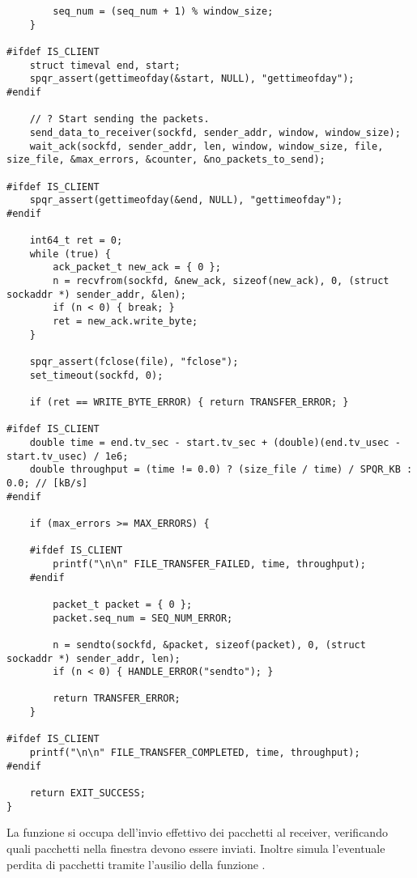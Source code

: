 \begin{lstlisting}
        seq_num = (seq_num + 1) % window_size;
    }

#ifdef IS_CLIENT
    struct timeval end, start;
    spqr_assert(gettimeofday(&start, NULL), "gettimeofday");
#endif

    // ? Start sending the packets.
    send_data_to_receiver(sockfd, sender_addr, window, window_size);
    wait_ack(sockfd, sender_addr, len, window, window_size, file, size_file, &max_errors, &counter, &no_packets_to_send);
    
#ifdef IS_CLIENT
    spqr_assert(gettimeofday(&end, NULL), "gettimeofday");
#endif

    int64_t ret = 0;
    while (true) {
        ack_packet_t new_ack = { 0 };
        n = recvfrom(sockfd, &new_ack, sizeof(new_ack), 0, (struct sockaddr *) sender_addr, &len);
        if (n < 0) { break; }
        ret = new_ack.write_byte;
    }

    spqr_assert(fclose(file), "fclose");
    set_timeout(sockfd, 0);

    if (ret == WRITE_BYTE_ERROR) { return TRANSFER_ERROR; }

#ifdef IS_CLIENT
    double time = end.tv_sec - start.tv_sec + (double)(end.tv_usec - start.tv_usec) / 1e6;
    double throughput = (time != 0.0) ? (size_file / time) / SPQR_KB : 0.0; // [kB/s]
#endif

    if (max_errors >= MAX_ERRORS) {
    
    #ifdef IS_CLIENT
        printf("\n\n" FILE_TRANSFER_FAILED, time, throughput);
    #endif
    
        packet_t packet = { 0 };
        packet.seq_num = SEQ_NUM_ERROR;

        n = sendto(sockfd, &packet, sizeof(packet), 0, (struct sockaddr *) sender_addr, len);
        if (n < 0) { HANDLE_ERROR("sendto"); }
    
        return TRANSFER_ERROR;
    }

#ifdef IS_CLIENT
    printf("\n\n" FILE_TRANSFER_COMPLETED, time, throughput);
#endif

    return EXIT_SUCCESS;
}
\end{lstlisting}

La funzione  si occupa dell'invio effettivo dei pacchetti al receiver, verificando quali pacchetti nella finestra devono essere inviati.
Inoltre simula l'eventuale perdita di pacchetti tramite l'ausilio della funzione .

